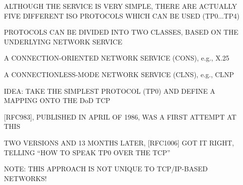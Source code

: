 

\begin{bwslide}

\begin{nrtc}
\item	ALTHOUGH THE SERVICE IS VERY SIMPLE, THERE ARE ACTUALLY FIVE DIFFERENT
	ISO PROTOCOLS WHICH CAN BE USED (TP0$\ldots$TP4)

\item	PROTOCOLS CAN BE DIVIDED INTO TWO CLASSES, BASED ON THE UNDERLYING
	NETWORK SERVICE
    \begin{nrtc}
    \item	A CONNECTION-ORIENTED NETWORK SERVICE (CONS), e.g., X.25
		

    \item	A CONNECTIONLESS-MODE NETWORK SERVICE (CLNS), e.g., CLNP
    \end{nrtc}
\end{nrtc}
\end{bwslide}


\begin{bwslide}

\begin{nrtc}
\item	IDEA: TAKE THE SIMPLEST PROTOCOL (TP0) AND DEFINE A MAPPING ONTO
	THE DoD TCP

\item{}	[RFC983], PUBLISHED IN APRIL OF 1986, WAS A FIRST ATTEMPT AT THIS

\item	TWO VERSIONS AND 13 MONTHS LATER, [RFC1006] GOT IT RIGHT, TELLING
	``HOW TO SPEAK TP0 OVER THE TCP''

\item	NOTE: THIS APPROACH IS NOT UNIQUE TO TCP/IP-BASED NETWORKS!
\end{nrtc}
\end{bwslide}




